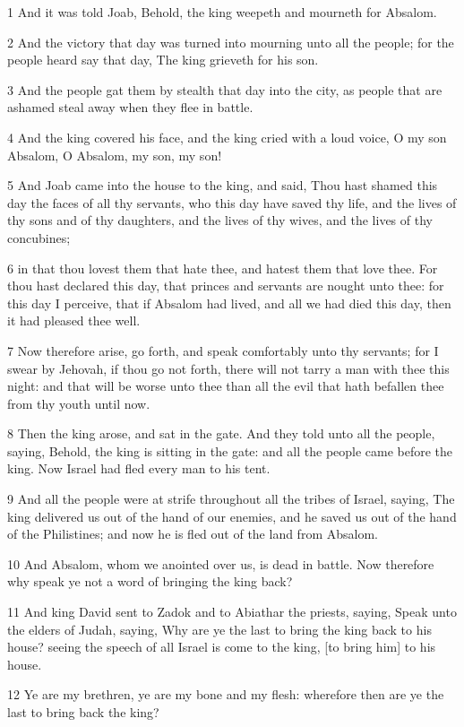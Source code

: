 \par 1 And it was told Joab, Behold, the king weepeth and mourneth for Absalom.
\par 2 And the victory that day was turned into mourning unto all the people; for the people heard say that day, The king grieveth for his son.
\par 3 And the people gat them by stealth that day into the city, as people that are ashamed steal away when they flee in battle.
\par 4 And the king covered his face, and the king cried with a loud voice, O my son Absalom, O Absalom, my son, my son!
\par 5 And Joab came into the house to the king, and said, Thou hast shamed this day the faces of all thy servants, who this day have saved thy life, and the lives of thy sons and of thy daughters, and the lives of thy wives, and the lives of thy concubines;
\par 6 in that thou lovest them that hate thee, and hatest them that love thee. For thou hast declared this day, that princes and servants are nought unto thee: for this day I perceive, that if Absalom had lived, and all we had died this day, then it had pleased thee well.
\par 7 Now therefore arise, go forth, and speak comfortably unto thy servants; for I swear by Jehovah, if thou go not forth, there will not tarry a man with thee this night: and that will be worse unto thee than all the evil that hath befallen thee from thy youth until now.
\par 8 Then the king arose, and sat in the gate. And they told unto all the people, saying, Behold, the king is sitting in the gate: and all the people came before the king. Now Israel had fled every man to his tent.
\par 9 And all the people were at strife throughout all the tribes of Israel, saying, The king delivered us out of the hand of our enemies, and he saved us out of the hand of the Philistines; and now he is fled out of the land from Absalom.
\par 10 And Absalom, whom we anointed over us, is dead in battle. Now therefore why speak ye not a word of bringing the king back?
\par 11 And king David sent to Zadok and to Abiathar the priests, saying, Speak unto the elders of Judah, saying, Why are ye the last to bring the king back to his house? seeing the speech of all Israel is come to the king, [to bring him] to his house.
\par 12 Ye are my brethren, ye are my bone and my flesh: wherefore then are ye the last to bring back the king?
